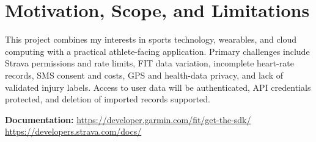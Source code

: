 \documentclass[11pt,letterpaper]{article}
\begin{document}
\section{Motivation, Scope, and Limitations}
This project combines my interests in sports technology, wearables, and cloud computing with a practical athlete-facing application. Primary challenges include Strava permissions and rate limits, FIT data variation, incomplete heart-rate records, SMS consent and costs, GPS and health-data privacy, and lack of validated injury labels. Access to user data will be authenticated, API credentials protected, and deletion of imported records supported. 

\vspace{4pt}
{\small\textbf{Documentation:} \url{https://developer.garmin.com/fit/get-the-sdk/} \quad \url{https://developers.strava.com/docs/} }
\end{document}
